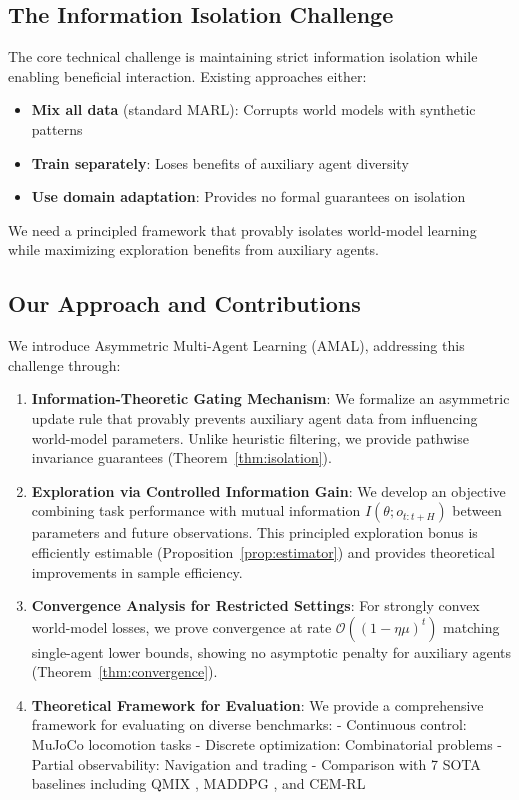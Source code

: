 \documentclass[12pt, a4paper]{article}
\begin{document}
\subsection{The Information Isolation Challenge}

The core technical challenge is maintaining strict information isolation while enabling beneficial interaction. Existing approaches either:
\begin{itemize}
\item \textbf{Mix all data} (standard MARL): Corrupts world models with synthetic patterns
\item \textbf{Train separately}: Loses benefits of auxiliary agent diversity
\item \textbf{Use domain adaptation}: Provides no formal guarantees on isolation
\end{itemize}

We need a principled framework that provably isolates world-model learning while maximizing exploration benefits from auxiliary agents.

\subsection{Our Approach and Contributions}

We introduce Asymmetric Multi-Agent Learning (AMAL), addressing this challenge through:

\begin{enumerate}
\item \textbf{Information-Theoretic Gating Mechanism}: We formalize an asymmetric update rule that provably prevents auxiliary agent data from influencing world-model parameters. Unlike heuristic filtering, we provide pathwise invariance guarantees (Theorem~\ref{thm:isolation}).

\item \textbf{Exploration via Controlled Information Gain}: We develop an objective combining task performance with mutual information $I(\theta; o_{t:t+H})$ between parameters and future observations. This principled exploration bonus is efficiently estimable (Proposition~\ref{prop:estimator}) and provides theoretical improvements in sample efficiency.

\item \textbf{Convergence Analysis for Restricted Settings}: For strongly convex world-model losses, we prove convergence at rate $\mathcal{O}((1-\eta\mu)^t)$ matching single-agent lower bounds, showing no asymptotic penalty for auxiliary agents (Theorem~\ref{thm:convergence}).

\item \textbf{Theoretical Framework for Evaluation}: We provide a comprehensive framework for evaluating on diverse benchmarks:
   - Continuous control: MuJoCo locomotion tasks
   - Discrete optimization: Combinatorial problems  
   - Partial observability: Navigation and trading
   - Comparison with 7 SOTA baselines including QMIX \cite{rashid2018qmix}, MADDPG \cite{lowe2017multi}, and CEM-RL \cite{pourchot2018cem}
\end{enumerate}
\end{document}
